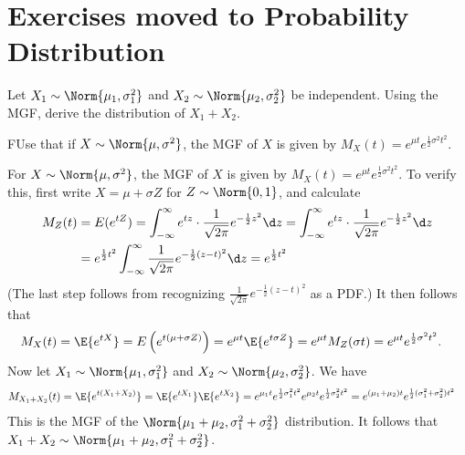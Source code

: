 	
\section{Exercises moved to Probability Distribution}	
	\begin{exercise}\label{ex:chap06:01}
		Let $X_1\sim \Norm{\mu_1, \sigma_1^2}$ and	$X_2\sim \Norm{\mu_2, \sigma_2^2}$ be independent. Using the MGF, derive the distribution of $X_1 + X_2$.
		\begin{hint}
			FUse that if $X \sim \Norm{\mu, \sigma^2}$, the MGF of $X$ is given by $M_X(t) = e^{\mu t} e^{\frac{1}{2} \sigma^2 t^2}$.
		\end{hint}
		\begin{solution}
			For $X \sim \Norm{\mu, \sigma^2}$, the MGF of $X$ is given by $M_X(t) = e^{\mu t} e^{\frac{1}{2} \sigma^2 t^2}$. To verify this, first write $X = \mu + \sigma Z$ for $Z \sim \Norm{0,1}$, and calculate
			\begin{align*}
				M_Z(t) & = E(e^{tZ}) = \int_{-\infty}^{\infty} e^{tz} \cdot \frac{1}{\sqrt{2 \pi}} e^{-\frac{1}{2} z^2} \d z = \int_{-\infty}^{\infty} e^{tz} \cdot \frac{1}{\sqrt{2 \pi}} e^{-\frac{1}{2} z^2} \d z \\
				& = e^{\frac{1}{2} t^2} \int_{-\infty}^{\infty} \frac{1}{\sqrt{2 \pi}} e^{-\frac{1}{2} (z - t)^2} \d z = e^{\frac{1}{2} t^2}
			\end{align*}
			(The last step follows from recognizing $\frac{1}{\sqrt{2 \pi}} e^{-\frac{1}{2} (z - t)^2}$ as a PDF.) It then follows that
			\begin{align*}
				M_X(t) & = \E{e^{tX}} = E\left(e^{t(\mu + \sigma Z)}\right) = e^{\mu t} \E{e^{t \sigma Z}} = e^{\mu t} M_Z(\sigma t) = e^{\mu t} e^{\frac{1}{2} \sigma^2 t^2}.
			\end{align*}
			Now let $X_1\sim \Norm{\mu_1, \sigma_1^2}$ and $X_2\sim \Norm{\mu_2, \sigma_2^2}$. We have
			\begin{align*}
				M_{X_1 + X_2}(t) & = \E{e^{t(X_1 + X_2)}} = \E{e^{t X_1}} \E{e^{t X_2}} = e^{\mu_1 t} e^{\frac{1}{2} \sigma_1^2 t^2} e^{\mu_2 t} e^{\frac{1}{2} \sigma_2^2 t^2} = e^{(\mu_1 + \mu_2) t} e^{\frac{1}{2} (\sigma_1^2 + \sigma_2^2) t^2}
			\end{align*}
			This is the MGF of the $\Norm{\mu_1 + \mu_2, \sigma_1^2 + \sigma_2^2}$ distribution. It follows that $X_1 + X_2 \sim \Norm{\mu_1 + \mu_2, \sigma_1^2 + \sigma_2^2}$.
		\end{solution}
	\end{exercise}
	
